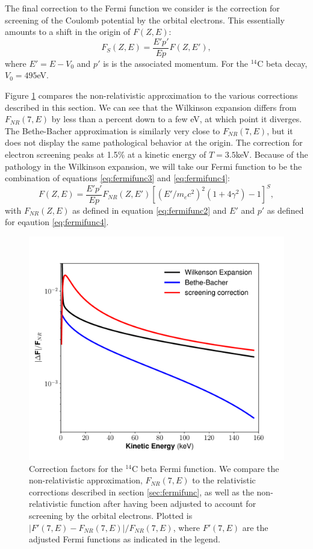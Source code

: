 The final correction to the Fermi function we consider is the correction for screening of the Coulomb potential by the orbital electrons. This essentially amounts to a shift in the origin of $F(Z,E)$\cite{C14_Wietfeldt,beta_screening}:
\begin{equation}\label{eq:fermifunc4}
F_{S}(Z,E)=\frac{E'p'}{Ep}F(Z,E'),
\end{equation}
where $E'=E-V_0$ and $p'$ is is the associated momentum. For the $^{14}$C beta decay, $V_0=495$eV\cite{C14_Wietfeldt}.

Figure \ref{fig:C14_spec_corrs} compares the non-relativistic approximation to the various corrections described in this section. We can see that the Wilkinson expansion differs from $F_{NR}(7,E)$ by less than a percent down to a few eV, at which point it diverges. The Bethe-Bacher approximation is similarly very close to $F_{NR}(7,E)$, but it does not display the same pathological behavior at the origin. The correction for electron screening peaks at 1.5\% at a kinetic energy of $T=3.5$keV. Because of the pathology in the Wilkinson expansion, we will take our Fermi function to be the combination of equations \ref{eq:fermifunc3} and \ref{eq:fermifunc4}:
\begin{equation}\label{eq:fermifunc5}
F(Z,E)=\frac{E'p'}{Ep}F_{NR}(Z,E')[(E'/m_ec^2)^2(1+4\gamma^2)-1]^S,
\end{equation}
with $F_{NR}(Z,E)$ as defined in equation \ref{eq:fermifunc2} and $E'$ and $p'$ as defined for eqaution \ref{eq:fermifunc4}.

\begin{figure}[h!]
\centering
\includegraphics[width=\textwidth]{Figures/FermiFunc_compare.pdf}
\caption{Correction factors for the $^{14}$C beta Fermi function. We compare the non-relativistic approximation, $F_{NR}(7,E)$ to the relativistic corrections described in section \ref{sec:fermifunc}, as well as the non-relativistic function after having been adjusted to account for screening by the orbital electrons. Plotted is $|F'(7,E)-F_{NR}(7,E)|/F_{NR}(7,E)$, where $F'(7,E)$ are the adjusted Fermi functions as indicated in the legend.} 
\label{fig:C14_spec_corrs}
\end{figure}

